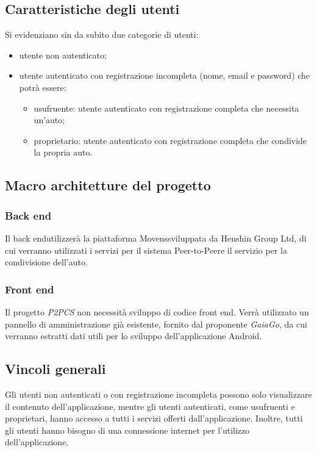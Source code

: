 \subsection{Caratteristiche degli utenti}
Si evidenziano sin da subito due categorie di utenti:
\begin{itemize}
	\item utente non autenticato;
	\item utente autenticato con registrazione incompleta (nome, email e password) che potrà essere:
		\begin{itemize}
			\item usufruente: utente autenticato con registrazione completa che necessita un'auto;
			\item proprietario: utente autenticato con registrazione completa che condivide la propria auto.
		\end{itemize}
\end{itemize}

\subsection{Macro architetture del progetto}
\subsubsection{Back end}
Il back end\glosp utilizzerà la piattaforma Movens\glosp sviluppata da Henshin Group Ltd, di cui verranno utilizzati i servizi per il sistema Peer-to-Peer\glosp e il servizio per la condivisione dell'auto. 

\subsubsection{Front end}
Il progetto \textit{P2PCS} non necessità sviluppo di codice front end\glo.
Verrà utilizzato un pannello di amministrazione già esistente, fornito dal proponente \textit{GaiaGo}, da cui verranno estratti dati utili per lo sviluppo dell'applicazione Android\glo.

\subsection{Vincoli generali}
Gli utenti non autenticati o con registrazione incompleta possono solo visualizzare il contenuto dell'applicazione, mentre gli utenti autenticati, come usufruenti e proprietari, hanno accesso a tutti i servizi offerti dall'applicazione. Inoltre, tutti gli utenti hanno bisogno di una connessione internet per l'utilizzo dell'applicazione.

 
